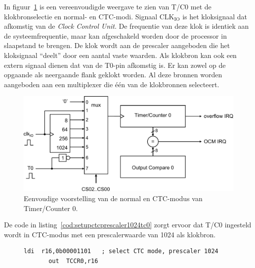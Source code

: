 In figuur~\ref{fig:timsimplenormalctctc0} is een vereenvoudigde weergave
te zien van T/C0 met de klokbronselectie en normal- en CTC-modi. Signaal
$\text{CLK}_\text{IO}$ is het kloksignaal dat afkomstig van de
\textsl{Clock Control Unit}. De frequentie van deze klok is identiek aan
de systeemfrequentie, maar kan afgeschakeld worden door de processor in
slaapstand te brengen. De klok wordt aan de prescaler aangeboden die het
kloksignaal ``deelt'' door een aantal vaste waarden. Als klokbron kan
ook een extern signaal dienen dat van de T0-pin afkomstig is. Er kan
zowel op de opgaande als neergaande flank geklokt worden. Al deze
bronnen worden aangeboden aan een multiplexer die één van de klokbronnen
selecteert.

\begin{figure}[!ht]
\centering
\includegraphics[scale=\figscale]{images/timsimplenormalctctc0}
\caption{Eenvoudige voorstelling van de normal en CTC-modus van Timer/Counter 0.}
\label{fig:timsimplenormalctctc0}
\end{figure}



De code in listing~\ref{cod:setupctcprescaler1024tc0} zorgt ervoor dat T/C0
ingesteld wordt in CTC-modus met een prescalerwaarde van 1024 als klokbron.

\begin{figure}[!ht]
\begin{lstlisting}[language=AVRassembler,caption=Selectie van CTC-modus en prescaler 1024.,label=cod:setupctcprescaler1024tc0]
       ldi  r16,0b00001101   ; select CTC mode, prescaler 1024
       out  TCCR0,r16
\end{lstlisting}
\end{figure}

